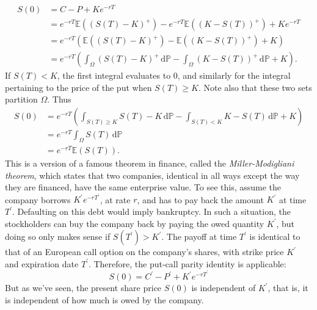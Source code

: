 \documentclass[]{article}
\newcommand{\EE}{\mathbb{E}}
\newcommand{\PP}{\mathbb{P}}
\theoremstyle{definition}
\theoremstyle{remark}
\begin{document}
\begin{align*}
	S(0) &= C - P + Ke^{-rT} \\
	&= e^{-rT} \EE((S(T) - K)^+) - e^{-rT} \EE((K - S(T))^+) + Ke^{-rT} \\
	&= e^{-rT}( \EE((S(T) - K)^+) -  \EE((K - S(T))^+) + K) \\
	&= e^{-rT}  
	\left( \int_\Omega (S(T) - K)^+ \, \text{d} \PP
	- \int_\Omega (K - S(T))^+ \, \text{d}  \PP + K
	\right ).
\end{align*}
If $S(T) < K$, the first integral evaluates to $0$, and similarly for the integral pertaining to the price of the put when $S(T) \geq K$. Note also that these two sets partition $\Omega$. Thus
\begin{align*}
	S(0) &= e^{-rT}
	\left(
	\int_{S(T) \geq K} S(T)-K \, \text{d} \PP
	-
	\int_{S(T) < K} K - S(T) \, \text{d} \PP + K
	\right) \\
	&= e^{-rT} \int_\Omega S(T) \, \text{d}\PP \\
	&= e^{-rT}\EE(S(T)).
\end{align*}
This is a version of a famous theorem in finance, called the \textit{Miller-Modigliani theorem}, which states that two companies, identical in all ways except the way they are financed, have the same enterprise value.\cite{capinski2004measure} To see this, assume the company borrows $K^\prime e^{-rT^\prime}$, at rate $r$,  and has to pay back the amount $K^\prime$ at time $T^\prime$. Defaulting on this debt would imply bankruptcy. In such a situation, the stockholders can buy the company back by paying the owed quantity $K^\prime$, but doing so only makes sense if $S(T^\prime) > K^\prime$. The payoff at time $T^\prime$ is identical to that of an European call option on the company's shares, with strike price $K^\prime$ and expiration date $T^\prime$. Therefore, the put-call parity identity is applicable:
\[
 S(0)  = C^\prime - P^\prime + K^\prime e^{-rT^\prime}
\]
But as we've seen, the present share price $S(0)$ is independent of $K^\prime$, that is, it is independent of how much is owed by the company. 
\nocite{*}
 
\end{document}
